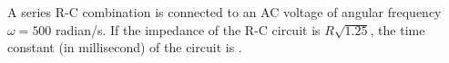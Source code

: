 
\item A series R-C combination is connected to an AC voltage of angular frequency $\omega = 500$ radian/s. If the impedance of the R-C circuit is $R\sqrt{1.25}$, the time constant (in millisecond) of the circuit is \underline{\hspace{2.5cm}}.
